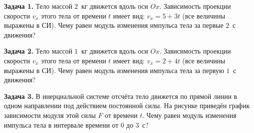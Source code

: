
\begin{taskbasic}[code={\label{task:momentum_v1_n3}}]
\textbf{Задача 1.} Тело массой $2$~кг движется вдоль оси $Ox$. Зависимость проекции скорости $v_x$ этого тела от времени $t$ имеет вид: $v_x = 5 + 3t$ (все величины выражены в СИ). Чему равен модуль изменения импульса тела за первые $2$~с движения?

\end{taskbasic}

\begin{taskbasic}[code={\label{task:momentum_v2_n3}}]
\textbf{Задача 2.} Тело массой $1$~кг движется вдоль оси $Ox$. Зависимость проекции скорости $v_x$ этого тела от времени $t$ имеет вид: $v_x = 2 + 4t$ (все величины выражены в СИ). Чему равен модуль изменения импульса тела за первую $1$~с движения?

\end{taskbasic}

\begin{taskbasic}[code={\label{task:momentum_v5_n3}}]
\textbf{Задача 3.} В инерциальной системе отсчёта тело движется по прямой линии в одном направлении под действием постоянной силы. На рисунке приведён график зависимости модуля этой силы $F$ от времени $t$. Чему равен модуль изменения импульса тела в интервале времени от $0$ до $3$~с?

\nopagebreak\smallskip
\begin{center}
\end{center}

\end{taskbasic}

